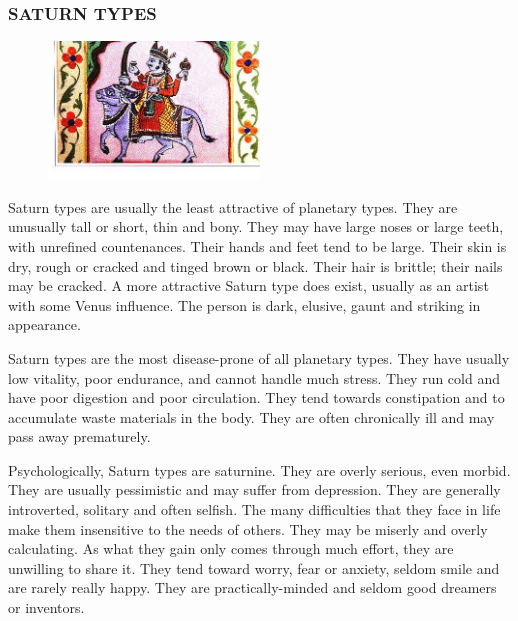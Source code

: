  



\subsubsection{SATURN TYPES }


 \begin{figure}[H]
 \centering
\includegraphics[width=0.5\textwidth]{pics/Saturn_type.png}
 \end{figure}
 
 

Saturn types are usually the least attractive of planetary types. They are unusually tall or short, thin and bony. They may have large noses or large teeth, with unrefined countenances. Their hands and feet tend to be large. Their skin is dry, rough or cracked and tinged brown or black. Their hair is brittle; their nails may be cracked. A more attractive Saturn type does exist, usually as an artist with some Venus influence. The person is dark, elusive, gaunt and striking in appearance.

 

Saturn types are the most disease-prone of all planetary types. They have usually low vitality, poor endurance, and cannot handle much stress. They run cold and have poor digestion and poor circulation. They tend towards constipation and to accumulate waste materials in the body. They are often chronically ill and may pass away prematurely.

 

Psychologically, Saturn types are saturnine. They are overly serious, even morbid. They are usually pessimistic and may suffer from depression. They are generally introverted, solitary and often selfish. The many difficulties that they face in life make them insensitive to the needs of others. They may be miserly and overly calculating. As what they gain only comes through much effort, they are unwilling to share it. They tend toward worry, fear or anxiety, seldom smile and are rarely really happy. They are practically-minded and seldom good dreamers or inventors.

